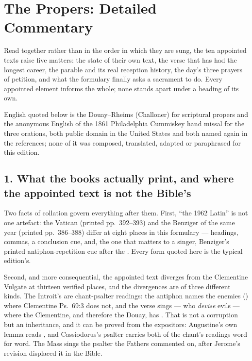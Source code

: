 \sectionguard
\section*{The Propers: Detailed Commentary}

Read together rather than in the order in which they are sung, the ten
appointed texts raise five matters: the state of their own text, the verse
that has had the longest career, the parable and its real reception history,
the day's three prayers of petition, and what the formulary finally asks a
sacrament to do. Every appointed element informs the whole; none stands apart
under a heading of its own.
\latinpolicynote

English quoted below is the Douay--Rheims (Challoner) for scriptural propers
and the anonymous English of the 1861 Philadelphia Cummiskey hand missal for
the three orations, both public domain in the United States and both named
again in the references; none of it was composed, translated, adapted or
paraphrased for this edition.

\subsection*{1. What the books actually print, and where the appointed text is not the Bible's}

Two facts of collation govern everything after them. First, ``the 1962 Latin'' is not one artefact: the Vatican
 (printed pp.~392--393) and the Benziger  of the same year (printed pp.~386--388) differ at eight places
in this formulary --- headings, commas, a conclusion cue, and, the one that
matters to a singer, Benziger's printed antiphon-repetition cue 
after the . Every form quoted here is the typical
edition's.

Second, and more consequential, the appointed text diverges from the
Clementine Vulgate at thirteen verified places, and the divergences are of
three different kinds. The Introit's are chant-psalter readings: the antiphon
names the enemies () where Clementine Ps.~69:3 does not,
and the verse sings  --- who \textit{devise}
evils --- where the Clementine, and therefore the Douay, has . That is not a corruption but an inheritance, and it can be proved
from the expositors: Augustine's own lemma reads , and Cassiodorus's psalter carries both of the chant's readings word for
word. The Mass sings the psalter the Fathers commented on, after Jerome's
revision displaced it in the Bible.

